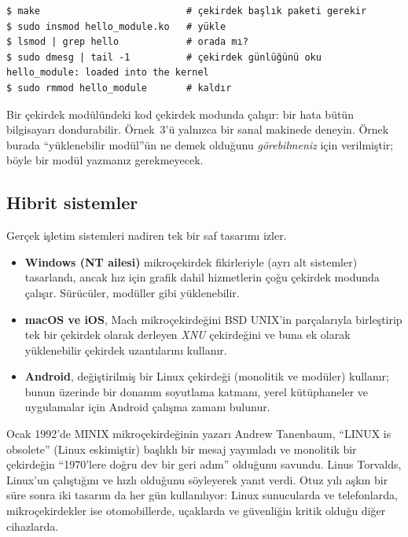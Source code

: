 \documentclass[11pt,a4paper]{article}
\begin{document}


\begin{lstlisting}[style=term]
$ make                          # çekirdek başlık paketi gerekir
$ sudo insmod hello_module.ko   # yükle
$ lsmod | grep hello            # orada mı?
$ sudo dmesg | tail -1          # çekirdek günlüğünü oku
hello_module: loaded into the kernel
$ sudo rmmod hello_module       # kaldır
\end{lstlisting}

\begin{tryit}
Bir çekirdek modülündeki kod çekirdek modunda çalışır: bir hata bütün bilgisayarı dondurabilir. Örnek~3'ü yalnızca bir sanal makinede deneyin. Örnek burada ``yüklenebilir modül''ün ne demek olduğunu \emph{görebilmeniz} için verilmiştir; böyle bir modül yazmanız gerekmeyecek.
\end{tryit}

\subsection{Hibrit sistemler}

Gerçek işletim sistemleri nadiren tek bir saf tasarımı izler.

\begin{itemize}
  \item \textbf{Windows (NT ailesi)} mikroçekirdek fikirleriyle (ayrı alt sistemler) tasarlandı, ancak hız için grafik dahil hizmetlerin çoğu çekirdek modunda çalışır. Sürücüler, modüller gibi yüklenebilir.
  \item \textbf{macOS ve iOS}, Mach mikroçekirdeğini BSD UNIX'in parçalarıyla birleştirip tek bir çekirdek olarak derleyen \emph{XNU} çekirdeğini ve buna ek olarak yüklenebilir çekirdek uzantılarını kullanır.
  \item \textbf{Android}, değiştirilmiş bir Linux çekirdeği (monolitik ve modüler) kullanır; bunun üzerinde bir donanım soyutlama katmanı, yerel kütüphaneler ve uygulamalar için Android çalışma zamanı bulunur.
\end{itemize}

\begin{histnote}
Ocak 1992'de MINIX mikroçekirdeğinin yazarı Andrew Tanenbaum, ``LINUX is obsolete'' (Linux eskimiştir) başlıklı bir mesaj yayımladı ve monolitik bir çekirdeğin ``1970'lere doğru dev bir geri adım'' olduğunu savundu. Linus Torvalds, Linux'un çalıştığını ve hızlı olduğunu söyleyerek yanıt verdi. Otuz yılı aşkın bir süre sonra iki tasarım da her gün kullanılıyor: Linux sunucularda ve telefonlarda, mikroçekirdekler ise otomobillerde, uçaklarda ve güvenliğin kritik olduğu diğer cihazlarda.
\end{histnote}
\end{document}
